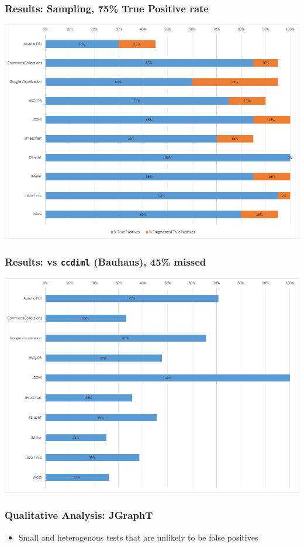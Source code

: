 \documentclass{beamer}
\begin{document}
\begin{frame}
\frametitle{Results: Sampling, 75\% True Positive rate} {
   \includegraphics[width=\textwidth, keepaspectratio=true]{images/percent_true_positives.png}
   }
\end{frame}

\begin{frame}
\frametitle{Results: vs {\tt ccdiml} (Bauhaus), 45\% missed} {
   \includegraphics[width=\textwidth, keepaspectratio=true]{images/percent_not_ccdiml.png}
   }
\end{frame}

\begin{frame}
\frametitle{Qualitative Analysis: JGraphT} {
   \Large
     \begin{itemize}
        \item Small and heterogenous tests that are unlikely to be false positives
     \end{itemize}
}
\end{frame}
\end{document}
